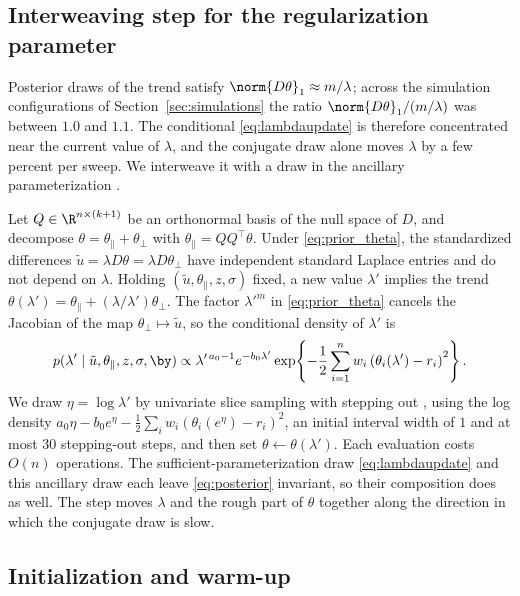 \subsection{Interweaving step for the regularization parameter}
\label{app:pmala:asis}

Posterior draws of the trend satisfy $\norm{D\theta}_1 \approx m/\lambda$; across the simulation configurations of Section~\ref{sec:simulations} the ratio $\norm{D\theta}_1/(m/\lambda)$ was between $1.0$ and $1.1$. The conditional \eqref{eq:lambdaupdate} is therefore concentrated near the current value of $\lambda$, and the conjugate draw alone moves $\lambda$ by a few percent per sweep. We interweave it with a draw in the ancillary parameterization \citep{yu2011center}.

Let $Q \in \R^{n\times(k+1)}$ be an orthonormal basis of the null space of $D$, and decompose $\theta = \theta_\parallel + \theta_\perp$ with $\theta_\parallel = QQ^\top\theta$. Under \eqref{eq:prior_theta}, the standardized differences $\tilde u = \lambda D\theta = \lambda D\theta_\perp$ have independent standard Laplace entries and do not depend on $\lambda$. Holding $(\tilde u, \theta_\parallel, z, \sigma)$ fixed, a new value $\lambda'$ implies the trend $\theta(\lambda') = \theta_\parallel + (\lambda/\lambda')\theta_\perp$. The factor $\lambda'^m$ in \eqref{eq:prior_theta} cancels the Jacobian of the map $\theta_\perp \mapsto \tilde u$, so the conditional density of $\lambda'$ is
\[
p(\lambda' \mid \tilde u, \theta_\parallel, z, \sigma, \by) \propto \lambda'^{\,a_0 - 1} e^{-b_0\lambda'} \exp\!\left\{-\frac12 \sum_{i=1}^n w_i\left(\theta_i(\lambda') - r_i\right)^2\right\}.
\]
We draw $\eta = \log\lambda'$ by univariate slice sampling with stepping out \citep{neal2003slice}, using the log density $a_0\eta - b_0 e^\eta - \frac12\sum_i w_i(\theta_i(e^\eta) - r_i)^2$, an initial interval width of $1$ and at most $30$ stepping-out steps, and then set $\theta \leftarrow \theta(\lambda')$. Each evaluation costs $O(n)$ operations. The sufficient-parameterization draw \eqref{eq:lambdaupdate} and this ancillary draw each leave \eqref{eq:posterior} invariant, so their composition does as well. The step moves $\lambda$ and the rough part of $\theta$ together along the direction in which the conjugate draw is slow.

\subsection{Initialization and warm-up}
\label{app:pmala:init}

